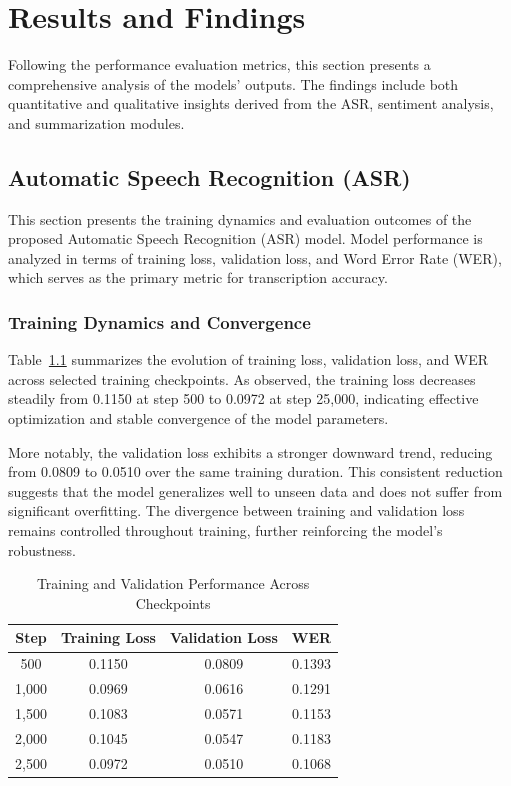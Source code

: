\chapter{Results and Findings}
Following the performance evaluation metrics, this section presents a comprehensive analysis of the models' outputs. The findings include both quantitative and qualitative insights derived from the ASR, sentiment analysis, and summarization modules.

\section{Automatic Speech Recognition (ASR)}

This section presents the training dynamics and evaluation outcomes of the proposed Automatic Speech Recognition (ASR) model. Model performance is analyzed in terms of training loss, validation loss, and Word Error Rate (WER), which serves as the primary metric for transcription accuracy.

\subsection{Training Dynamics and Convergence}

Table~\ref{tab:training_metrics} summarizes the evolution of training loss, validation loss, and WER across selected training checkpoints. As observed, the training loss decreases steadily from 0.1150 at step 500 to 0.0972 at step 25,000, indicating effective optimization and stable convergence of the model parameters.

More notably, the validation loss exhibits a stronger downward trend, reducing from 0.0809 to 0.0510 over the same training duration. This consistent reduction suggests that the model generalizes well to unseen data and does not suffer from significant overfitting. The divergence between training and validation loss remains controlled throughout training, further reinforcing the model’s robustness.

\begin{table}[h]
\centering
\caption{Training and Validation Performance Across Checkpoints}
\label{tab:training_metrics}
\begin{tabular}{cccc}
\hline
\textbf{Step} & \textbf{Training Loss} & \textbf{Validation Loss} & \textbf{WER} \\
\hline
500   & 0.1150 & 0.0809 & 0.1393 \\
1,000 & 0.0969 & 0.0616 & 0.1291 \\
1,500 & 0.1083 & 0.0571 & 0.1153 \\
2,000 & 0.1045 & 0.0547 & 0.1183 \\
2,500 & 0.0972 & 0.0510 & 0.1068 \\
\hline
\end{tabular}
\end{table}

